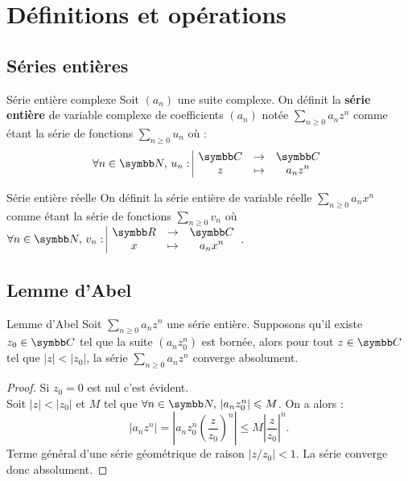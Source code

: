 \section{Définitions et opérations}
\subsection{Séries entières}

\begin{definition}{Série entière complexe}{}
    Soit $(a_n)$ une suite complexe. On définit la \textbf{série entière} de variable 
    complexe de coefficients $(a_n)$ notée $\displaystyle \sum_{n \geqslant 0} a_n z^n$ comme étant la série de fonctions 
    $\displaystyle \sum_{n \geqslant 0} u_n$ où :
    \[\forall n \in \N, \, \fonction{u_n}{\C}{\C}{z}{a_n z^n}\]
\end{definition}

\begin{definition}{Série entière réelle}{}
    On définit la série entière de variable réelle $\displaystyle \sum_{n \geqslant 0} a_n x^n$ comme étant la série de fonctions
    $\displaystyle \sum_{n \geqslant 0} v_n$ où $\forall n \in \N, \, \fonction{v_n}{\R}{\C}{x}{a_n x^n}$.
\end{definition}

\subsection{Lemme d'Abel}

\begin{proposition}{Lemme d'Abel}{}
    Soit $\sum_{n \geqslant 0 } a_n z^n $ une série entière. Supposons qu'il existe 
    $z_0 \in \C$ tel que la suite $(a_n z_0^n)$ est bornée, alors 
    pour tout $z \in \C$ tel que $|z| < |z_0|$, la série $\sum_{n \geqslant 0} a_n z^n$ converge absolument.
\end{proposition}


\begin{proof}
    Si $z_0 = 0$ est nul c'est évident. \\
    Soit $|z| < |z_0|$ et $M$ tel que $\forall n \in \N, \, |a_n z_0^n| \leqslant M$. On a alors :
    \[
        |a_n z^n| = \left| a_n z_0^n \left( \frac{z}{z_0} \right)^n \right| \leqslant M \left| \frac{z}{z_0} \right|^n.
    \]
    Terme général d'une série géométrique de raison $|z/z_0| < 1$. La série converge donc absolument.
\end{proof}

